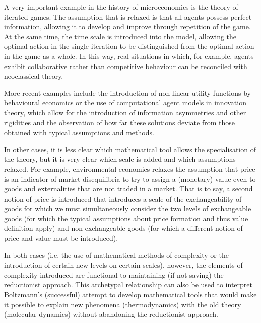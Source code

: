 A very important example in the history of microeconomics is the theory of iterated games. The assumption that is relaxed is that all agents possess perfect information, allowing it to develop and improve through repetition of the game. At the same time, the time scale is introduced into the model, allowing the optimal action in the single iteration to be distinguished from the optimal action in the game as a whole.
In this way, real situations in which, for example, agents exhibit collaborative rather than competitive behaviour can be reconciled with neoclassical theory.

More recent examples include the introduction of non-linear utility functions
by behavioural economics or the use of computational agent models in innovation theory, which allow for the introduction of information asymmetries and other rigidities and the observation of how far these solutions deviate from those obtained with typical assumptions and methods.

In other cases, it is less clear which mathematical tool allows the specialisation of the theory, but it is very clear which scale is added and which assumptions relaxed. For example, environmental economics relaxes the assumption that price is an indicator of market disequilibria to try to assign a (monetary) value even to goods and externalities that are not traded in a market.
That is to say, a second notion of price is introduced that introduces a scale of the exchangeability of goods for which we must simultaneously consider the two levels of exchangeable goods (for which the typical assumptions about price formation and thus value definition apply) and non-exchangeable goods (for which a different notion of price and value must be introduced).

In both cases (i.e. the use of mathematical methods of complexity or the introduction of certain new levels on certain scales), however, the elements of complexity introduced are functional to maintaining (if not saving) the reductionist approach.
This archetypal relationship can also be used to interpret Boltzmann's (successful) attempt to develop mathematical tools that would make it possible to explain new phenomena (thermodynamics) with the old theory (molecular dynamics) without abandoning the reductionist approach.

